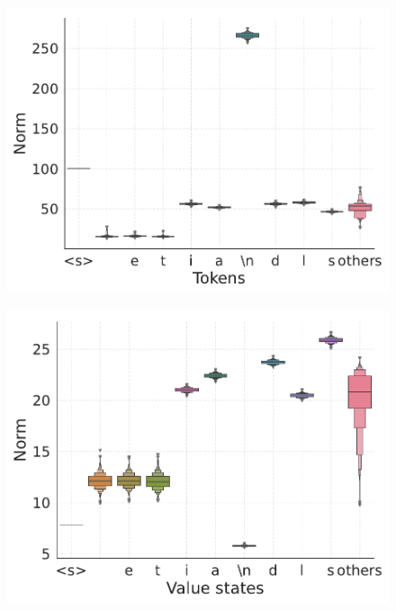 \begin{figure}[t]
  \centering
  \begin{minipage}{0.4\textwidth}
      \centering
      \label{fig:pretraining-massive-norm}
      \vspace{-.2em}
      \includegraphics[width=\linewidth]{Figures/figures_pretraining/dormant_copy/dormant_copy_L3_massive.pdf}
  \end{minipage}
  \begin{minipage}{0.4\textwidth}
      \centering
      \label{fig:pretraining-small-value}
      \vspace{-.2em}
      \includegraphics[width=\linewidth]{Figures/figures_pretraining/dormant_copy/dormant_copy_L3_minor.pdf}

\end{minipage}
\end{figure}
